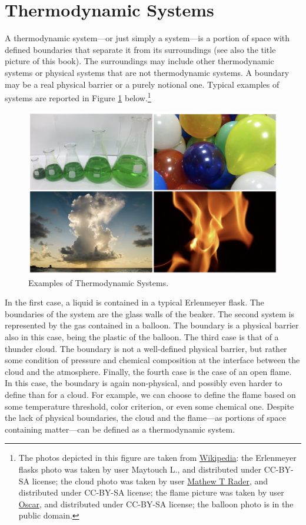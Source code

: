 \documentclass[
  9pt,
]{extbook}
\theoremstyle{definition}
\theoremstyle{definition}
\theoremstyle{definition}
\theoremstyle{remark}
\begin{document}
\hypertarget{thermodynamic-systems}{%
\section{Thermodynamic Systems}\label{thermodynamic-systems}}

A thermodynamic system---or just simply a system---is a portion of space with defined boundaries that separate it from its surroundings (see also the title picture of this book). The surroundings may include other thermodynamic systems or physical systems that are not thermodynamic systems. A boundary may be a real physical barrier or a purely notional one. Typical examples of systems are reported in Figure \ref{fig:Fig1c1} below.\footnote{The photos depicted in this figure are taken from \href{https://en.wikipedia.org}{Wikipedia}: the Erlenmeyer flasks photo was taken by user Maytouch L., and distributed under CC-BY-SA license; the cloud photo was taken by user \href{https://commons.wikimedia.org/wiki/User:Matthew_T_Rader}{Mathew T Rader}, and distributed under CC-BY-SA license; the flame picture was taken by user \href{https://commons.wikimedia.org/wiki/User:Oscar}{Oscar}, and distributed under CC-BY-SA license; the balloon photo is in the public domain.}

\begin{figure}

{\centering \includegraphics[width=0.7\linewidth]{./img/OEP_Figures.001} 

}

\caption{Examples of Thermodynamic Systems.}\label{fig:Fig1c1}
\end{figure}

In the first case, a liquid is contained in a typical Erlenmeyer flask. The boundaries of the system are the glass walls of the beaker. The second system is represented by the gas contained in a balloon. The boundary is a physical barrier also in this case, being the plastic of the balloon. The third case is that of a thunder cloud. The boundary is not a well-defined physical barrier, but rather some condition of pressure and chemical composition at the interface between the cloud and the atmosphere. Finally, the fourth case is the case of an open flame. In this case, the boundary is again non-physical, and possibly even harder to define than for a cloud. For example, we can choose to define the flame based on some temperature threshold, color criterion, or even some chemical one. Despite the lack of physical boundaries, the cloud and the flame---as portions of space containing matter---can be defined as a thermodynamic system.
\end{document}

